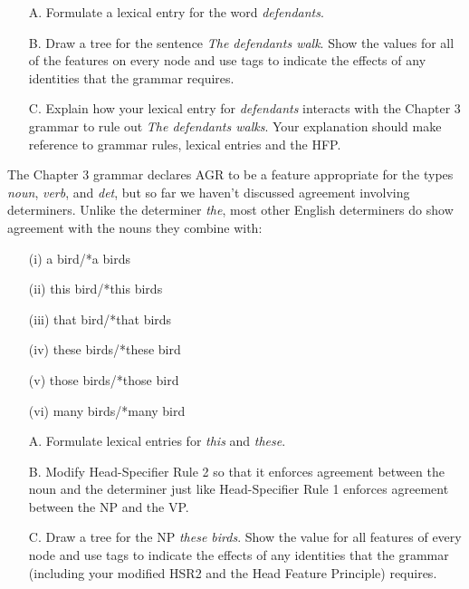 \documentclass[a4paper,landscape,headrule,footrule]{foils}
\begin{document}
\begin{itemize}
\item[A.] Formulate  a  lexical entry for the word {\it defendants}.
\item[B.] Draw a tree for the sentence {\it The defendants walk}.  Show
the values for all of the features on every node and use tags to indicate
the effects of any identities that the %
grammar requires.
\item[C.] Explain how your lexical entry for {\it defendants} interacts
with the Chapter 3 grammar to rule out {\it *The defendants walks}.
Your explanation should make reference to grammar rules, lexical
entries and the HFP. 
\end{itemize}


The Chapter 3 grammar declares AGR to be a feature
appropriate for the types {\it noun}, {\it verb}, and {\it det}, but
so far we haven't discussed agreement involving determiners.  Unlike
the determiner {\it the}, most other English determiners do show
agreement with the nouns they combine with:

\begin{itemize}\addtolength{\itemsep}{-1ex}
\item[(i)] a bird/*a birds
\item[(ii)] this bird/*this birds
\item[(iii)] that bird/*that birds
\item[(iv)] these birds/*these bird
\item[(v)] those birds/*those bird
\item[(vi)] many birds/*many bird
\end{itemize}
\newpage

\begin{itemize}
\item[A.] Formulate lexical entries for {\it this} and {\it these}.
\item[B.] Modify Head-Specifier Rule 2 so that it enforces agreement
between the noun and the determiner just like Head-Specifier Rule 1
enforces agreement between the NP and the VP.
\item[C.] Draw a tree for the NP {\it these birds}. Show the
value for all features of every node and use tags to indicate the
effects of any identities that the %
grammar 
(including your modified
HSR2 and the Head Feature Principle) requires.
\end{itemize}
\end{document}
